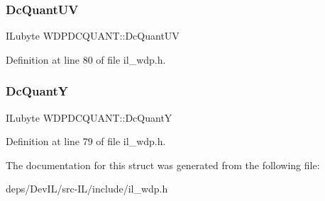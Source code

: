 \subsubsection{\texorpdfstring{Dc\+Quant\+UV}{DcQuantUV}}
{\footnotesize\ttfamily I\+Lubyte W\+D\+P\+D\+C\+Q\+U\+A\+N\+T\+::\+Dc\+Quant\+UV}



Definition at line 80 of file il\+\_\+wdp.\+h.

\mbox{\label{structWDPDCQUANT_ac34b691a0c1bce9f7a3809c6d4cd6d7e}} 
\subsubsection{\texorpdfstring{Dc\+QuantY}{DcQuantY}}
{\footnotesize\ttfamily I\+Lubyte W\+D\+P\+D\+C\+Q\+U\+A\+N\+T\+::\+Dc\+QuantY}



Definition at line 79 of file il\+\_\+wdp.\+h.



The documentation for this struct was generated from the following file\+:\begin{DoxyCompactItemize}
\item 
deps/\+Dev\+I\+L/src-\/\+I\+L/include/il\+\_\+wdp.\+h\end{DoxyCompactItemize}
